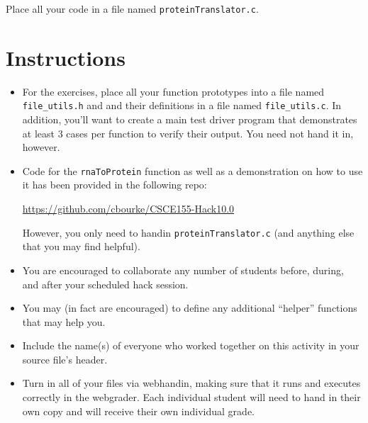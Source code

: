 \documentclass[12pt]{scrartcl}
\begin{document}
Place all your code in a file named \texttt{proteinTranslator.c}.

\section*{Instructions}

\begin{itemize}

  \item For the exercises, place all your function prototypes into a file 
  named \texttt{file_utils.h} and and their definitions in a
  file named \texttt{file_utils.c}.  In addition, you'll want
  to create a main test driver program that demonstrates at least 3 cases 
  per function to verify their output.  You need not hand it in, however.
  
  \item Code for the \texttt{rnaToProtein} function as well as 
  a demonstration on how to use it has been provided in the following repo:

  \url{https://github.com/cbourke/CSCE155-Hack10.0}

  However, you only need to handin \texttt{proteinTranslator.c}
  (and anything else that you may find helpful).

  \item You are encouraged to collaborate any number of students 
  before, during, and after your scheduled hack session.  

  \item You may (in fact are encouraged) to define any additional
  ``helper'' functions that may help you.

  \item Include the name(s) of everyone who worked together on
  this activity in your source file's header.

  \item Turn in all of your files via webhandin, making sure that 
  it runs and executes correctly in the webgrader.  Each individual 
  student will need to hand in their own copy and will receive 
  their own individual grade.
\end{itemize}  
\end{document}
